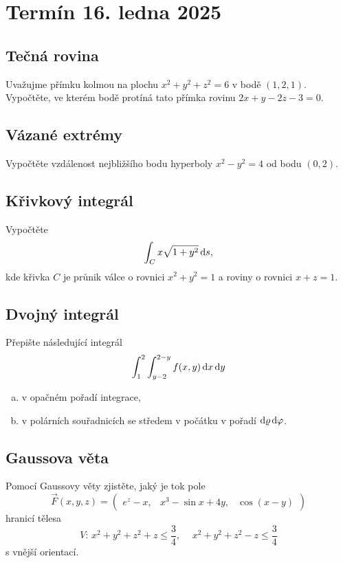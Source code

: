 \section{Termín 16. ledna 2025}

\subsection{Tečná rovina}
Uvažujme přímku kolmou na plochu $x^2 + y^2 + z^2 = 6$ v bodě $(1, 2, 1)$.\\
Vypočtěte, ve kterém bodě protíná tato přímka rovinu $2x + y - 2z - 3 = 0$.

\subsection{Vázané extrémy}
Vypočtěte vzdálenost nejbližšího bodu hyperboly $x^2 - y^2 = 4$ od bodu $(0,2)$.

\subsection{Křivkový integrál}
Vypočtěte
\[
\int_{C} x \sqrt{1+y^2} \mathop{}\!\mathrm{d} s\text{,}
\]
kde křivka $C$ je průnik válce o rovnici $x^2+y^2 = 1$ a roviny o rovnici $x+z=1$.

\subsection{Dvojný integrál}
Přepište následující integrál
\[
\int_{1}^{2} \int_{y-2}^{2-y} f(x,y) \mathop{}\!\mathrm{d} x \mathop{}\!\mathrm{d} y
\]
\begin{enumerate}[a), noitemsep]
    \item v opačném pořadí integrace,
    \item v polárních souřadnicích se středem v počátku v pořadí $\mathop{}\!\mathrm{d} \varrho \mathop{}\!\mathrm{d} \varphi$.
\end{enumerate}

\subsection{Gaussova věta}
Pomocí Gaussovy věty zjistěte, jaký je tok pole
\[
    \vec{F}(x,y,z) =
    \begin{pmatrix}
        e^z - x, & x^3 - \sin x + 4y, & \cos(x-y)
    \end{pmatrix}
\]
hranicí tělesa
\[ 
    V\text{: } x^2 + y^2 + z^2 + z \leq \frac{3}{4} \text{, } \quad x^2 + y^2 + z^2 - z \leq \frac{3}{4} 
\]
s vnější orientací.